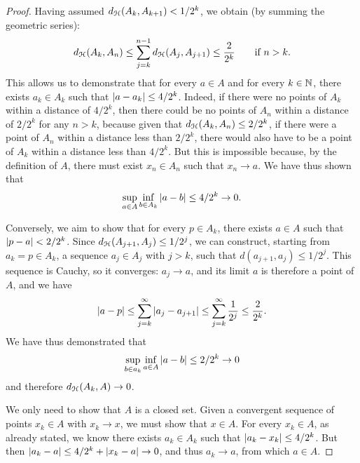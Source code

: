 \begin{proof}
Having assumed $d_\mathcal H(A_k, A_{k+1}) < 1/2^k$, we obtain (by summing the geometric
series):
\[
  d_\mathcal H(A_k, A_n) \le \sum_{j=k}^{n-1} d_\mathcal H(A_j, A_{j+1}) \le \frac{2}{2^k}\qquad
 \text{if $n>k$}.
\]
This allows us to demonstrate that for every $a\in A$ and for every $k\in {\mathbb N}$,
there exists $a_k \in A_k$ such that
${\left|a - a_k\right|}\le 4/2^k$. Indeed, if there were no points of $A_k$ within a
distance of $4/2^k$, then there could be no points of $A_n$ within a distance of
$2/2^k$ for any $n>k$, because given that $d_\mathcal H(A_k,A_n) \le 2/2^k$, if there
were a point of $A_n$ within a distance less than $2/2^k$, there would also have
to be a point of $A_k$ within a distance less than $4/2^k$. But this is
impossible because, by the definition of $A$, there must exist $x_n \in A_n$
such that $x_n \to a$. We have thus shown that
\[
  \sup_{a\in A} \inf_{b\in A_k} {\left|a-b\right|} \le 4/2^k \to 0.
\]

Conversely, we aim to show that for every $p \in A_k$, there exists $a \in A$
such that ${\left|p-a\right|} < 2/2^k$.
Since $d_\mathcal H(A_{j+1},A_j) \le 1/2^j$, we can construct, starting from $a_k=p \in
A_k$, a sequence $a_j \in A_j$ with $j > k$, such that $d(a_{j+1},a_j) \le
1/2^j$. This sequence is Cauchy, so it converges: $a_j \to a$, and its limit $a$
is therefore a point of $A$, and we have
\[
  {\left|a-p\right|} \le \sum_{j=k}^\infty {\left|a_j - a_{j+1}\right|}
    \le \sum_{j=k}^\infty \frac{1}{2^j} \le \frac{2}{2^k}.
\]
We have thus demonstrated that
\[
  \sup_{b\in a_k} \inf_{a\in A} {\left|a-b\right|} \le 2/2^k \to 0
\]
and therefore $d_\mathcal H(A_k,A)\to 0$.

We only need to show that $A$ is a closed set. Given a convergent sequence of
points $x_k\in A$ with $x_k\to x$, we must show that $x\in A$. For every $x_k\in
A$, as already stated, we know there exists $a_k \in A_k$ such that
${\left|a_k-x_k\right|}\le 4/2^k$. But then ${\left|a_k-a\right|} \le 4/2^k + {\left|x_k-a\right|} \to 0$,
and thus $a_k\to a$, from which $a\in A$.
 \end{proof}

